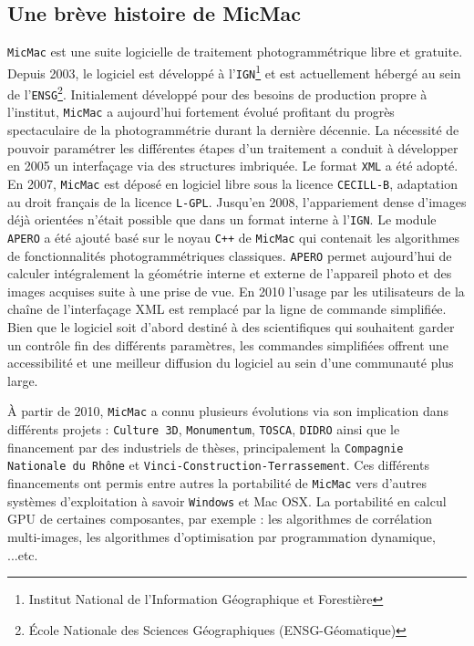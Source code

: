 \documentclass[a4paper,10pt]{article} %
\begin{document}
\subsection{Une brève histoire de MicMac}
{\tt MicMac} est une suite logicielle de traitement photogrammétrique libre et gratuite. Depuis 2003, le logiciel est développé à l'{\tt IGN}\footnote{Institut National de l'Information Géographique et Forestière} et est actuellement hébergé au sein de l'{\tt ENSG}\footnote{École Nationale des Sciences Géographiques (ENSG-Géomatique)}. Initialement développé pour des besoins de production propre à l'institut, {\tt MicMac} a aujourd'hui fortement évolué profitant du progrès spectaculaire de la photogrammétrie durant la dernière décennie. La nécessité de pouvoir paramétrer les différentes étapes d'un traitement a conduit à développer en 2005 un interfaçage via des structures imbriquée. Le format {\tt XML} a été adopté. En 2007, {\tt MicMac} est déposé en logiciel libre sous la licence {\tt CECILL-B}, adaptation au droit français de la licence {\tt L-GPL}. Jusqu'en 2008, l’appariement dense d'images déjà orientées n'était possible que dans un format interne à l'{\tt IGN}. Le module {\tt APERO} a été ajouté basé sur le noyau {\tt C++} de {\tt MicMac} qui contenait les algorithmes de fonctionnalités photogrammétriques classiques. {\tt APERO} permet aujourd'hui de calculer intégralement la géométrie interne et externe de l’appareil photo et des images acquises suite à une prise de vue. En 2010 l'usage par les utilisateurs de la chaîne de l'interfaçage XML est remplacé par la ligne de commande simplifiée. Bien que le logiciel soit d’abord destiné à des scientifiques qui souhaitent garder un contrôle fin des différents paramètres, les commandes simplifiées offrent une accessibilité et une meilleur diffusion du logiciel au sein d'une communauté plus large.\newline

À partir de 2010, {\tt MicMac} a connu plusieurs évolutions via son implication dans différents projets : {\tt Culture 3D}, {\tt Monumentum}, {\tt TOSCA}, {\tt DIDRO} ainsi que le financement par des industriels de thèses, principalement la {\tt Compagnie Nationale du Rhône} et {\tt Vinci-Construction-Terrassement}. Ces différents financements ont permis entre autres la portabilité de {\tt MicMac} vers d'autres systèmes d'exploitation à savoir {\tt Windows} et {Mac OSX}. La portabilité en calcul GPU de certaines composantes, par exemple : les algorithmes de corrélation multi-images, les algorithmes d'optimisation par programmation dynamique, ...etc. 
\end{document}
